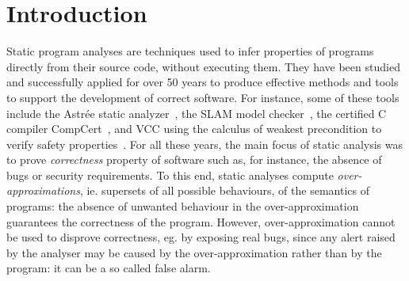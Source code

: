 
\chapter{Introduction}\label{ch:intro}
Static program analyses are techniques used to infer properties of programs directly from their source code, without executing them. They have been studied and successfully applied for over 50 years to produce effective methods and tools to support the development of correct software. For instance, some of these tools include the Astrée static analyzer~\cite{BCCFMMMR03}, the SLAM model checker~\cite{BR01}, the certified C compiler CompCert~\cite{Leroy09}, and VCC using the calculus of weakest precondition to verify safety properties~\cite{CDHLMSST09}.
For all these years, the main focus of static analysis was to prove \emph{correctness} property of software such as, for instance, the absence of bugs or security requirements. To this end, static analyses compute \emph{over-approximations}, ie. supersets of all possible behaviours, of the semantics of programs: the absence of unwanted behaviour in the over-approximation guarantees the correctness of the program. However, over-approximation cannot be used to disprove correctness, eg. by exposing real bugs, since any alert raised by the analyser may be caused by the over-approximation rather than by the program: it can be a so called false alarm.

